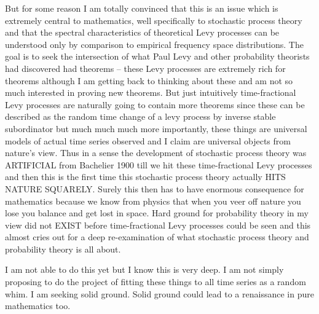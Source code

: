 \documentclass{amsart}
\begin{document}
But for some reason I am totally convinced that this is an issue which is extremely central to mathematics, well specifically to stochastic process theory and that the spectral characteristics of theoretical Levy processes can be understood only by comparison to empirical frequency space distributions.  The goal is to seek the intersection of what Paul Levy and other probability theorists had discovered had theorems -- these Levy processes are extremely rich for theorems although I am getting back to thinking about these and am not so much interested in proving new theorems.  But just intuitively time-fractional Levy processes are naturally going to contain more theorems since these can be described as the random time change of a levy process by inverse stable subordinator but much much much more importantly, these things are universal models of actual time series observed and I claim are universal objects from nature's view.  Thus in a sense the development of stochastic process theory was ARTIFICIAL from Bachelier 1900 till we hit these time-fractional Levy processes and then this is the first time this stochastic process theory actually HITS NATURE SQUARELY.  Surely this then has to have enormous consequence for mathematics because we know from physics that when you veer off nature you lose you balance and get lost in space.  Hard ground for probability theory in my view did not EXIST before time-fractional Levy processes could be seen and this almost cries out for a deep re-examination of what stochastic process theory and probability theory is all about.

I am not able to do this yet but I know this is very deep.  I am not simply proposing to do the project of fitting these things to all time series as a random whim.  I am seeking solid ground.  Solid ground could lead to a renaissance in pure mathematics too.
\end{document}
